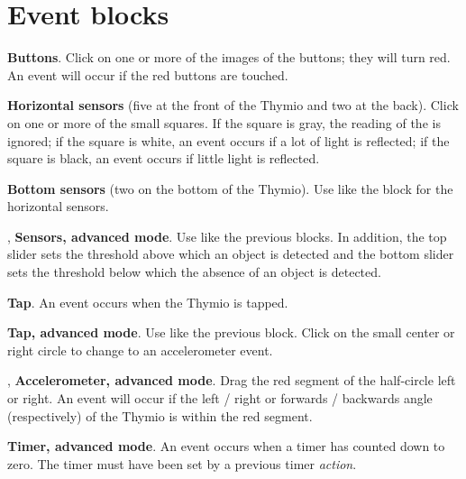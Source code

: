 
\label{a.blocks}

\section*{Event blocks}

 \textbf{Buttons}. Click on one or more of the images
of the buttons; they will turn red. An event will occur if the red
buttons are touched.

\bigskip\bigskip\bigskip\bigskip


 \textbf{Horizontal sensors} (five at the front of the
Thymio and two at the back). Click on one or more of the small squares.
If the square is gray, the reading of the is ignored; if the square is
white, an event occurs if a lot of light is reflected; if the square is
black, an event occurs if little light is reflected.

\bigskip

 \textbf{Bottom sensors} (two on the bottom of the
Thymio). Use like the block for the horizontal sensors.

\bigskip\bigskip

, 
\textbf{Sensors, advanced mode}. Use like the previous blocks. In
addition, the top slider sets the threshold above which an object is
detected and the bottom slider sets the threshold below which the
absence of an object is detected.

\bigskip\bigskip\bigskip\bigskip\bigskip\bigskip

 \textbf{Tap}. An event occurs when the Thymio is
tapped.

\bigskip\bigskip

 \textbf{Tap, advanced mode}. Use like the
previous block. Click on the small center or right circle to change to
an accelerometer event.

\bigskip\bigskip\bigskip\bigskip

,  \textbf{Accelerometer,
advanced mode}. Drag the red segment of the half-circle left or right.
An event will occur if the left / right or forwards / backwards angle
(respectively) of the Thymio is within the red segment.

\bigskip\bigskip\bigskip\bigskip\bigskip

 \textbf{Timer, advanced mode}. An event occurs when
a timer has counted down to zero. The timer must have been set by a
previous timer \emph{action}.

